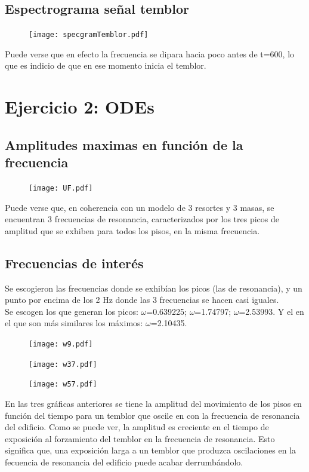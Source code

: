 \documentclass[11pt,letterpaper]{exam}
\begin{document}
\subsection{Espectrograma señal temblor}
\begin{figure}[H]
\centering
\texttt{[image: specgramTemblor.pdf]}
\end{figure}
Puede verse que en efecto la frecuencia se dipara hacia poco antes de t=600, lo que es indicio de que en ese momento inicia el temblor.

\section{Ejercicio 2: ODEs}
\subsection{Amplitudes maximas en función de la frecuencia}
\begin{figure}[H]
\centering
\texttt{[image: UF.pdf]}
\end{figure}
Puede verse que, en coherencia con un modelo de 3 resortes y 3 masas, se encuentran 3 frecuencias de resonancia, caracterizados por los tres picos de amplitud que se exhiben para todos los pisos, en la misma frecuencia. 

\subsection{Frecuencias de interés}
Se escogieron las frecuencias donde se exhibían los picos (las de resonancia), y un punto por encima de los 2 Hz donde las 3 frecuencias se hacen casi iguales.\\
Se escogen los que generan los picos: $\omega$=0.639225; $\omega$=1.74797;  $\omega$=2.53993. Y el en el que son más similares los máximos: $\omega$=2.10435.
\begin{figure}[H]
\centering
\texttt{[image: w9.pdf]}
\end{figure}

\begin{figure}[H]
\centering
\texttt{[image: w37.pdf]}
\end{figure}

\begin{figure}[H]
\centering
\texttt{[image: w57.pdf]}
\end{figure}

En las tres gráficas anteriores se tiene la amplitud del movimiento de los pisos en función del tiempo para un temblor que oscile en con la frecuencia de resonancia del edificio. Como se puede ver, la amplitud es creciente en el tiempo de exposición al forzamiento del temblor en la frecuencia de resonancia. Esto significa que, una exposición larga a un temblor que produzca oscilaciones en la fecuencia de resonancia del edificio puede acabar derrumbándolo.
\end{document}
